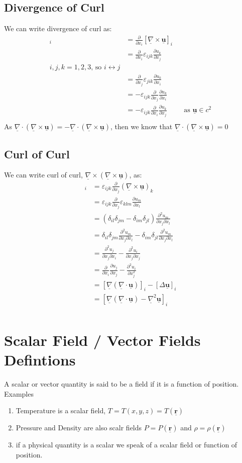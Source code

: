 \documentclass{article}
\renewcommand{\vec}[1]{\underline{\textbf{#1}}}
\newcommand{\e}{\varepsilon}
\newcommand{\nab}{\underline{\nabla}}
\newcommand{\pd}[2]{\frac{\partial #1}{\partial #2}}
\renewcommand{\div}{\nab \cdot}
\newcommand{\curl}{\nab \times}
\begin{document}
\subsection{Divergence of Curl}
We can write divergence of curl as:
\begin{align*}
  [\div\curl\vec u]_i &= \pd{}{x_i}[\curl\vec u]_i \\
  &= \pd{}{x_i}\e_{ijk}\pd{u_k}{x_j} \\
   \text{$i, j, k = 1, 2, 3$, so $i \leftrightarrow j$}\\
  &= \pd{}{x_j}\e_{jik}\pd{u_k}{x_i} \\
  &= -\e_{ijk}\pd{}{x_j}\pd{u_k}{x_i} \\
  &= -\e_{ijk}\pd{}{x_i}\pd{u_k}{x_j} && \text{as $\vec u \in c^2$} \\
\end{align*}
As $\div(\curl\vec u) = -\div(\curl\vec u)$, then we know that $\div(\curl\vec u) = 0$

\subsection{Curl of Curl}
We can write curl of curl, $ \curl(\curl\vec u)$, as:
\begin{align*}
  [\curl(\curl\vec u)]_i &= \e_{ijk}\pd{}{x_j}(\curl\vec u)_k \\
  &= \e_{ijk}\pd{}{x_j}\e_{klm}\pd{u_m}{x_l} \\
  &= (\delta_{il}\delta_{jm} - \delta_{im}\delta_{jl})\pd{^2 u_m}{x_j\partial x_l} \\
  &= \delta_{il}\delta_{jm}\pd{^2 u_m}{x_j\partial x_l} - \delta_{im}\delta_{jl}\pd{^2 u_m}{x_j\partial x_l} \\
  &= \pd{^2 u_j}{x_j \partial x_i} - \pd{^2 u_i}{x_j \partial x_j}\\
  &= \pd{}{x_i}\pd{u_j}{x_j} - \pd{^2 u_i}{x_j^2} \\
  &= [\nab(\div\vec u)]_i - [\Delta\vec u]_i\\
  &= [\nab(\div\vec u) - \nab^2\vec u]_i\\
\end{align*}

\section{Scalar Field / Vector Fields Defintions}

A scalar or vector quantity is said to be a {\color{blue} field }if it is a function of position. Examples
\begin{enumerate}
  \item {\color{orange}Temperature} is a scalar field, $T = T(x, y, z) = T(\vec r)$
  \item {\color{orange}Pressure and Density} are also scalr fields $P = P(\vec r)$ and $\rho = \rho(\vec r)$
  \item if a physical quantity is a scalar we speak of a scalar field or function of position.
\end{enumerate}
\end{document}
